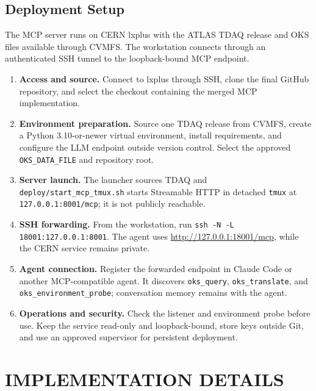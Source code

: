 \documentclass[12pt, a4paper]{report}
\begin{document}
\section{Deployment Setup}
The MCP server runs on CERN lxplus with the ATLAS TDAQ release and OKS files
available through CVMFS. The workstation connects through an authenticated SSH
tunnel to the loopback-bound MCP endpoint.

\begin{enumerate}[label=\Roman*., leftmargin=1.1cm]
  \item \textbf{Access and source.} Connect to lxplus through SSH, clone the
  final GitHub repository, and select the checkout containing the merged MCP
  implementation.

  \item \textbf{Environment preparation.} Source one TDAQ release from CVMFS,
  create a Python 3.10-or-newer virtual environment, install requirements, and
  configure the LLM endpoint outside version control. Select the approved
  \texttt{OKS\_DATA\_FILE} and repository root.

  \item \textbf{Server launch.} The launcher sources TDAQ and
  \texttt{deploy/start\_mcp\_tmux.sh} starts Streamable HTTP in detached
  \texttt{tmux} at \texttt{127.0.0.1:8001/mcp}; it is not publicly reachable.

  \item \textbf{SSH forwarding.} From the workstation, run
  \texttt{ssh -N -L 18001:127.0.0.1:8001}. The agent uses
  \url{http://127.0.0.1:18001/mcp}, while the CERN service remains private.

  \item \textbf{Agent connection.} Register the forwarded endpoint in Claude
  Code or another MCP-compatible agent. It discovers \texttt{oks\_query},
  \texttt{oks\_translate}, and \texttt{oks\_environment\_probe}; conversation
  memory remains with the agent.

  \item \textbf{Operations and security.} Check the listener and environment
  probe before use. Keep the service read-only and loopback-bound, store keys
  outside Git, and use an approved supervisor for persistent deployment.
\end{enumerate}


\chapter{IMPLEMENTATION DETAILS}
\end{document}
